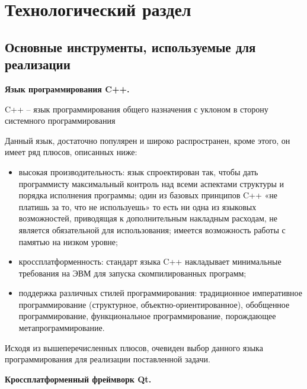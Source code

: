 \chapter{Технологический раздел}
\label{cha:impl}


\section{Основные инструменты, используемые для реализации}

\noindent\textbf{Язык программирования C++.}

C++ -- язык программирования общего назначения с уклоном в сторону системного программирования \cite{Cpp}

Данный язык, достаточно популярен и широко распространен, кроме этого, он имеет ряд плюсов, описанных ниже:

\begin{itemize}
	\item высокая производительность: язык спроектирован так, чтобы дать программисту максимальный контроль над всеми аспектами структуры и порядка исполнения программы; один из базовых принципов C++ «не платишь за то, что не используешь» то есть ни одна из языковых возможностей, приводящая к дополнительным накладным расходам, не является обязательной для использования; имеется возможность работы с памятью на низком уровне;
	\item кроссплатформенность: стандарт языка C++ накладывает минимальные требования на ЭВМ для запуска скомпилированных программ;
	\item поддержка различных стилей программирования: традиционное императивное программирование (структурное, объектно-ориентированное), обобщенное программирование, функциональное программирование, порождающее метапрограммирование.
\end{itemize}

Исходя из вышеперечисленных плюсов, очевиден выбор данного языка программирования для реализации поставленной задачи. %

\noindent\textbf{Кроссплатформенный фреймворк Qt.}


